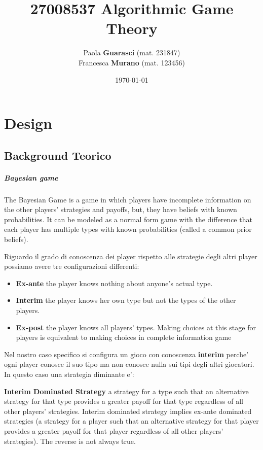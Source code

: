 \documentclass{report}
\title{27008537 \textbf{Algorithmic Game Theory}}
\author{Paola \textbf{Guarasci} (mat. 231847) \\ Francesca \textbf{Murano} (mat. 123456)}
\date{\today}
\begin{document}
\maketitle

\tableofcontents


\chapter{Design}
\section{Background Teorico}
\paragraph{Bayesian game}
The Bayesian Game is a game in which players have incomplete information on the other players' strategies and payoffs, but, they have beliefs with known probabilities. It can be modeled as a normal form game with the difference that each player has multiple types with known probabilities (called a common prior beliefs).

Riguardo il grado di conoscenza dei player rispetto alle strategie degli altri player possiamo avere tre configurazioni differenti:
\begin{itemize}
  \item \textbf{Ex-ante} the player knows nothing about anyone's actual type.
  \item \textbf{Interim} the player knows her own type but not the types of the other players.
  \item \textbf{Ex-post} the player knows all players' types. Making choices at this stage for players is equivalent to making choices in complete information game
\end{itemize}
Nel nostro caso specifico si configura un gioco con conoscenza \textbf{interim} perche' ogni player conosce il suo tipo ma non conosce nulla sui tipi degli altri giocatori. In questo caso una strategia diminante e':

\textbf{Interim Dominated Strategy} a strategy for a type such that an alternative strategy for that type provides a greater payoff for that type regardless of all other players' strategies. Interim dominated strategy implies ex-ante dominated strategies (a strategy for a player such that an alternative strategy for that player provides a greater payoff for that player regardless of all other players' strategies). The reverse is not always true.
\end{document}

